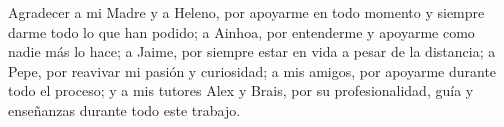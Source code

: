 \documentclass[11pt,a4paper,titlepage,oneside]{report}
\begin{document}

 
 \paxinaenbranco
 \begin{agradecementos}
  Agradecer a mi Madre y a Heleno, por apoyarme en todo momento y siempre darme todo lo que han podido; 
  a Ainhoa, por entenderme y apoyarme como nadie más lo hace; a Jaime, por siempre estar en vida a pesar de la distancia; a Pepe, por reavivar mi pasión y curiosidad; a mis amigos, por apoyarme durante todo el proceso; y a mis tutores Alex y Brais, por su profesionalidad, guía y enseñanzas durante todo este trabajo.
 \end{agradecementos}
 

 \setcounter{page}{1}

 \tableofcontents
 \listoffigures
 \listoftables
 \clearpage
 
 \setcounter{page}{1}


 
 
 
 
 
 
 
 
 
 


\appendix
\appendixpage




\glsaddall

\printglossary[type=\acronymtype,title=\nomeglosarioacronimos]
\printglossary[title=\nomeglosariotermos]



\clearpage
 
\end{document}
